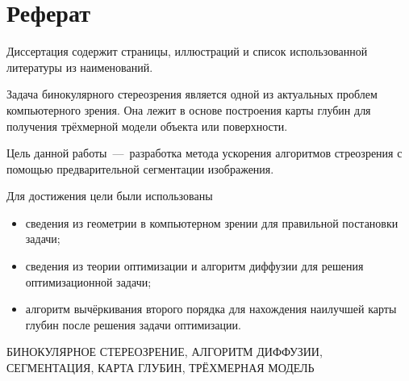 \chapter*{Реферат}

Диссертация содержит \pageref{LastPage} страницы,
 иллюстраций и список использованной литературы из
 наименований.

Задача бинокулярного стереозрения
является одной из актуальных проблем компьютерного зрения.
Она лежит в основе построения карты глубин для получения трёхмерной
модели объекта или поверхности.

Цель данной работы~---~разработка метода ускорения
алгоритмов стреозрения с помощью
предварительной сегментации изображения.

Для достижения цели были использованы
\begin{itemize}
  \item сведения из геометрии
        в компьютерном зрении для правильной постановки задачи;
  \item сведения из теории оптимизации и
        алгоритм диффузии для решения оптимизационной задачи;
  \item алгоритм вычёркивания второго порядка для нахождения наилучшей
  карты глубин после решения задачи оптимизации.
\end{itemize}

\MakeUppercase{бинокулярное стереозрение,
               алгоритм диффузии,
               сегментация,
               карта глубин,
               трёхмерная модель}
